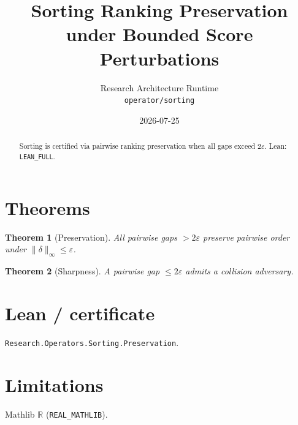 \documentclass[11pt]{article}
\title{Sorting Ranking Preservation under Bounded Score Perturbations}
\author{Research Architecture Runtime \\ \texttt{operator/sorting}}
\date{2026-07-25}
\newtheorem{theorem}{Theorem}
\begin{document}
\maketitle
\begin{abstract}
Sorting is certified via pairwise ranking preservation when all gaps exceed $2\varepsilon$. Lean: \texttt{LEAN\_FULL}.
\end{abstract}
\section{Theorems}
\begin{theorem}[Preservation]
All pairwise gaps $>2\varepsilon$ preserve pairwise order under $\|\delta\|_\infty\le\varepsilon$.
\end{theorem}
\begin{theorem}[Sharpness]
A pairwise gap $\le 2\varepsilon$ admits a collision adversary.
\end{theorem}
\section{Lean / certificate}
\texttt{Research.Operators.Sorting.Preservation}.
\section{Limitations}
Mathlib $\mathbb{R}$ (\texttt{REAL\_MATHLIB}).
\end{document}
